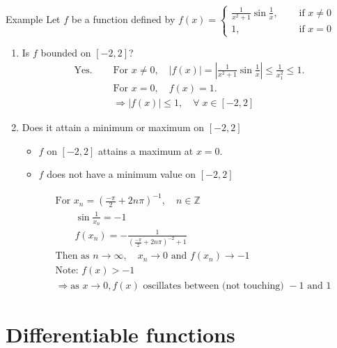 \documentclass{report}
\begin{document}
	\begin{question}{Example}
		Let $f$ be a function defined by $f(x) = \begin{cases} \frac{1}{x^2+1} \sin{\frac{1}{x}}, \quad & \text{ if } x \neq 0 \\	1, & \text{ if } x=0 \end{cases}$

		\begin{enumerate}
			\item Is $f$ bounded on $[-2,2]$?
				\begin{align*}
					\text{Yes. } \quad & \text{For } x \neq 0, \quad \left|f(x)\right| = \left| \frac{1}{x^2 + 1} \sin{\frac{1}{x}} \right| \leq \frac{1}{x^2 _ 1} \leq 1.	\\
									   & \text{For } x = 0, \quad f(x) = 1.	\\
									   & \Rightarrow \left|f(x)\right| \leq 1, \quad \forall \; x \in [-2,2]
				\end{align*}
			\item Does it attain a minimum or maximum on $[-2,2]$
				\begin{itemize}
					\item $f$ on $[-2,2]$ attains a maximum at $x=0$.
					\item $f$ does not have a minimum value on $[-2,2]$
				\end{itemize}
				\begin{align*}
					& \text{For } x_n = \left(\frac{-\pi}{2} + 2n \pi\right)^{-1}, \quad n \in \mathbb{Z}	\\
					& \qquad \sin{\frac{1}{x_n}} = -1	\\
					& \qquad f(x_n) = - \frac{1}{\left(\frac{- \pi}{2} + 2n \pi\right)^{-2} + 1}	\\
					& \text{Then as } n \rightarrow \infty, \quad x_n \rightarrow 0 \text{ and } f(x_n) \rightarrow -1	\\
					& \text{Note: } f(x) > -1	\\
					& \Rightarrow \text{as } x \rightarrow 0, f(x) \text{ oscillates between (not touching) } -1 \text{ and } 1
				\end{align*}
		\end{enumerate}
	\end{question}

\chapter{Differentiable functions}
\end{document}
